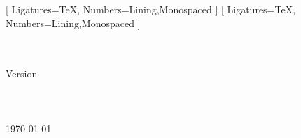 %
%

\setmainfont{Lato}[
  Ligatures=TeX,
  Numbers={Lining,Monospaced}
]
\setsansfont{Lato}[
  Ligatures=TeX,
  Numbers={Lining,Monospaced}
]

%




\begin{frame*}{}
\thispagestyle{AccessibleTitlePage}
\centering
{\LARGE\textcolor{blue}{\TalkTitle}}\\[0.5\baselineskip]
{\normalsize \urlu{\TalkURL}}\\[1.0\baselineskip]
{\large Version \TalkVersion}\\[1.0\baselineskip]
{\normalsize \TalkAuthor}\\[0.25\baselineskip]
{\normalsize {}}\\[0.75\baselineskip]
{\small \TalkInstitution}\\[0.25\baselineskip]
{\small \today}
\end{frame*}
\setcounter{frame}{0}%


